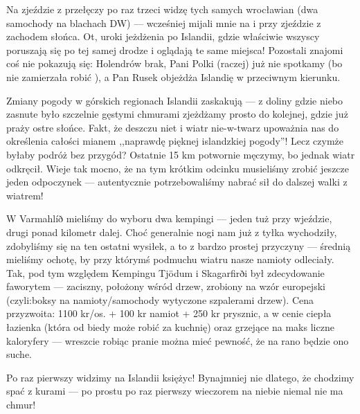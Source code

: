 Na zjeździe z przełęczy po raz trzeci widzę tych samych wrocławian (dwa samochody na blachach DW) --- wcześniej mijali mnie na  i przy zjeździe z zachodem słońca. Ot, uroki jeżdżenia po Islandii, gdzie właściwie wszyscy poruszają się po tej samej drodze i oglądają te same miejsca! Pozostali znajomi coś nie pokazują się: Holendrów brak, Pani Polki (raczej) już nie spotkamy (bo nie zamierzała robić ), a Pan Rusek objeżdża Islandię w przeciwnym kierunku.

Zmiany pogody w górskich regionach Islandii zaskakują --- z doliny gdzie niebo zasnute było szczelnie gęstymi chmurami zjeżdżamy prosto do kolejnej, gdzie już praży ostre słońce. Fakt, że deszczu niet i wiatr nie-w-twarz upoważnia nas do określenia całości mianem ,,naprawdę pięknej islandzkiej pogody''! Lecz czymże byłaby podróż bez przygód? Ostatnie 15 km potwornie męczymy, bo jednak wiatr odkręcił. Wieje tak mocno, że na tym krótkim odcinku musieliśmy zrobić jeszcze jeden odpoczynek --- autentycznie potrzebowaliśmy nabrać sił do dalszej walki z wiatrem!

W Varmahlíð mieliśmy do wyboru dwa kempingi --- jeden tuż przy wjeździe, drugi ponad kilometr dalej. Choć generalnie nogi nam już z tyłka wychodziły, zdobyliśmy się na ten ostatni wysiłek, a to z bardzo prostej przyczyny --- średnią mieliśmy ochotę, by przy którymś podmuchu wiatru nasze namioty odleciały. Tak, pod tym względem Kempingu Tjödum i Skagarfirði był zdecydowanie faworytem --- zaciszny, położony wśród drzew, zrobiony na wzór europejski (czyli:boksy na namioty/samochody wytyczone szpalerami drzew). Cena przyzwoita: 1100 kr/os. + 100 kr namiot + 250 kr prysznic, a w cenie ciepła łazienka (która od biedy może robić za kuchnię) oraz grzejące na maks liczne kaloryfery --- wreszcie robiąc pranie można mieć pewność, że na rano będzie ono suche.

Po raz pierwszy widzimy na Islandii księżyc! Bynajmniej nie dlatego, że chodzimy spać z kurami --- po prostu po raz pierwszy wieczorem na niebie niemal nie ma chmur!
